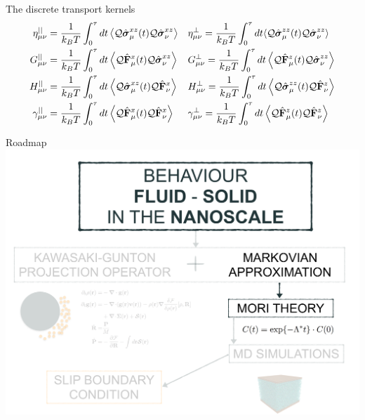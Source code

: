 \documentclass{beamer}
\begin{document}
\begin{frame}{The discrete transport kernels}
\begin{align}
\eta^{||}_{\mu\nu}&
=\frac{1}{k_BT}\int_0^\tau  dt\left\langle 
{\cal Q}\hat{\boldsymbol{\sigma}}^{xz}_\mu(t){\cal Q}\hat{\boldsymbol{\sigma}}^{xz}_\nu
\right\rangle&&
\eta^{\bot}_{\mu\nu}
= \frac{1}{k_BT}\int_0^\tau  dt\langle 
{\cal Q}\hat{\boldsymbol{\sigma}}^{zz}_\mu(t)
{\cal Q}\hat{\boldsymbol{\sigma}}^{zz}_\nu\rangle
\nonumber\\
G^{||}_{\mu\nu}&
=\frac{1}{k_BT} \int_0^\tau  dt
\left\langle{\cal Q}\hat{\bf F}^{x}_\mu(t)
{\cal Q}\hat{\boldsymbol{\sigma}}^{xz}_\nu
\right\rangle&&
G^{\bot}_{\mu\nu}=\frac{1}{k_BT} \int_0^\tau  dt
\left\langle {\cal Q}\hat{\bf F}^{z}_\mu(t)
{\cal Q}\hat{\boldsymbol{\sigma}}^{zz}_\nu
\right\rangle
\nonumber\\
H^{||}_{\mu\nu}&
=\frac{1}{k_BT} 
\int_0^\tau  dt
\left\langle{\cal Q}\hat{\boldsymbol{\sigma}}^{xz}_\mu(t){\cal Q}\hat{\bf F}^{x}_\nu\right\rangle&&
H^\bot_{\mu\nu}=\frac{1}{k_BT} 
\int_0^\tau  dt\left\langle {\cal Q}\hat{\boldsymbol{\sigma}}^{zz}_\mu(t){\cal Q}\hat{\bf F}^{z}_\nu\right\rangle
\nonumber\\
\gamma^{||}_{\mu\nu}&=
\frac{1}{k_BT} \int_0^\tau  dt
\left\langle 
{\cal Q}\hat{\bf F}^{x}_\mu(t)
{\cal Q}\hat{\bf F}^{x}_\nu\right\rangle&&
\gamma^{\bot}_{\mu\nu}=
\frac{1}{k_BT} \int_0^\tau  dt\left\langle 
{\cal Q}\hat{\bf F}^{z}_\mu(t){\cal Q}\hat{\bf F}^{z}_\nu
\right\rangle
\nonumber
\end{align}
\end{frame}

\begin{frame}{Roadmap}
  \includegraphics[width=\linewidth]{scheme-thesis-markovian}
\end{frame}
\end{document}
